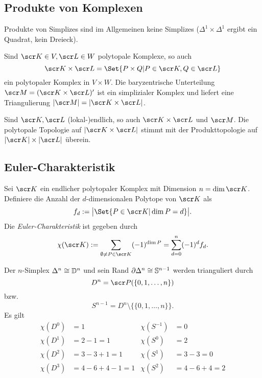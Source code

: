 \subsection{Produkte von Komplexen}

Produkte von Simplizes sind im Allgemeinen keine Simplizes ($\Delta^1 \times \Delta^1$ ergibt ein Quadrat, kein Dreieck).

\begin{st}
	Sind $\scr K \in V, \scr L \in W$ polytopale Komplexe, so auch
	\[
		\scr K \times \scr L = \Set{ P \times Q | P \in \scr K, Q \in \scr L }
	\]
	ein polytopaler Komplex in $V \times W$.
	Die baryzentrische Unterteilung $\scr M = (\scr K \times \scr L)'$ ist ein simplizialer Komplex und liefert eine Triangulierung $| \scr M| = | \scr K \times \scr L|$.

	Sind $\scr K, \scr L$ (lokal-)endlich, so auch $\scr K \times \scr L$ und $\scr M$.
	Die polytopale Topologie auf $|\scr K \times \scr L|$ stimmt mit der Produkttopologie auf $|\scr K| \times |\scr L|$ überein.
\end{st}

\subsection{Euler-Charakteristik}

\begin{df}
	Sei $\scr K$ ein endlicher polytopaler Komplex mit Dimension $n = \dim \scr K$.
	Definiere die Anzahl der $d$-dimensionalen Polytope von $\scr K$ als
	\[
		f_d := \big| \Set{ P \in \scr K | \dim P = d } \big|.
	\]
	Die \emph{Euler-Charakteristik} ist gegeben durch
	\[
		\chi(\scr K)
		:= \sum_{\emptyset \neq P \in \scr K} (-1)^{\dim P}
		= \sum_{d = 0}^n (-1)^d f_d.
	\]
\end{df}

\begin{ex}
	Der $n$-Simplex $\Delta^n \cong \mathbb{D}^n$ und sein Rand $\partial \Delta^n \cong \mathbb{S}^{n-1}$ werden trianguliert durch
	\[
		D^n
		= \scr P(\{0,1, \dotsc, n\})
	\]
	bzw.
	\[
		S^{n-1}
		= D^n \setminus \{ \{0,1,\dotsc,n\} \}.
	\]
	Es gilt
	\begin{align*}
		\chi(D^0) &= 1 &
		\chi(S^{-1}) &= 0 \\
		\chi(D^1) &= 2-1 = 1 &
		\chi(S^{0}) &= 2 \\
		\chi(D^2) &= 3 - 3 + 1 = 1 &
		\chi(S^{1}) &= 3 - 3 = 0 \\
		\chi(D^3) &= 4 - 6 + 4 - 1 = 1 &
		\chi(S^{2}) &= 4 - 6 + 4 = 2 \\
	\end{align*}
\end{ex}

